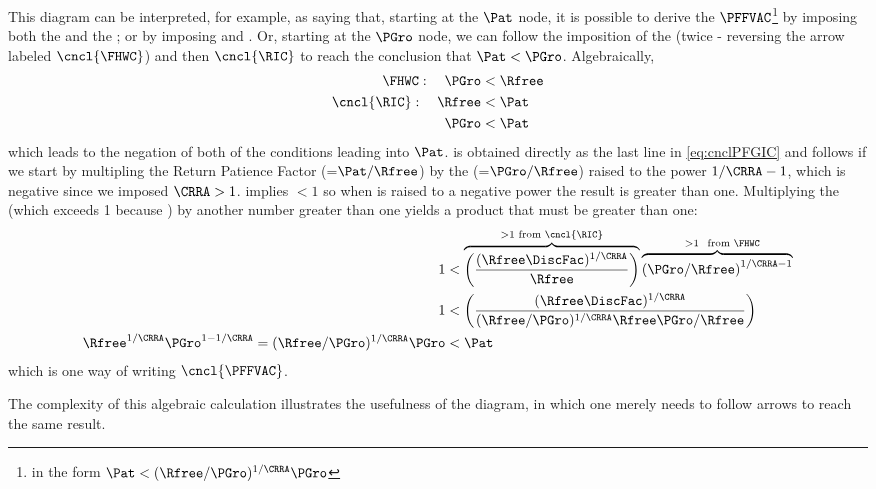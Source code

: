 \documentclass[\econtexRoot/BufferStockTheory]{subfiles}
\begin{document}
This diagram can be interpreted, for example, as saying  that, starting at the $\Pat$ node, it is possible to derive the $\PFFVAC$\footnote{in the form $\Pat < (\Rfree/\PGro)^{1/\CRRA}\PGro$} by imposing both the {\PFGIC} and the {\FHWC}; or by imposing {\RIC} and \cncl{\FHWC}.  Or, starting at the $\PGro$ node, we can follow the imposition of the {\FHWC} (twice - reversing the arrow labeled $\cncl{\FHWC}$) and then $\cncl{\RIC}$ to reach the conclusion that $\Pat < \PGro$.  Algebraically,
\begin{equation}\begin{gathered}\begin{aligned}
  {\FHWC}:~~~ \PGro & < \Rfree 
  \\ \cncl{\RIC}:~~~ \Rfree & < \Pat 
  \\ \PGro & < \Pat \label{eq:cnclPFGIC}
\end{aligned}\end{gathered}\end{equation}
which leads to the negation of both of the conditions leading into $\Pat$.  \cncl{\PFGIC} is obtained directly as the last line in \eqref{eq:cnclPFGIC} and \cncl{\PFFVAC} follows if we start by multipling the Return Patience Factor ({\RPF}=$\Pat/\Rfree$) by the \FHWF (=$\PGro/\Rfree$) raised to the power $1/\CRRA-1$, which is negative since we imposed $\CRRA > 1$.  {\FHWC} implies {\FHWF} $< 1$ so when {\FHWF} is raised to a negative power the result is greater than one.
Multiplying the {\RPF} (which exceeds 1 because \cncl{\RIC}) by another number greater than one yields a product that must be greater than one:
\begin{equation}\begin{gathered}\begin{aligned}
  1  & < \overbrace{\left(\frac{(\Rfree \DiscFac)^{1/\CRRA}}{\Rfree}\right)}^{>1 \text{~from~}\cncl{\RIC}}\overbrace{\left(\PGro/\Rfree\right)^{1/\CRRA-1}}^{\phantom{...}>1~\text{~from~} \FHWC} \notag
  \\ 1  & < \left(\frac{(\Rfree \DiscFac)^{1/\CRRA}}{(\Rfree/\PGro)^{1/\CRRA}\Rfree\PGro/\Rfree}\right) \label{eq:cnclFHWFAndcnclRICImplycnclPFFVAC}
  \\ \Rfree^{1/\CRRA}\PGro^{1 - 1/\CRRA} = (\Rfree/\PGro)^{1/\CRRA} \PGro  & < \Pat \notag
\end{aligned}\end{gathered}\end{equation}
which is one way of writing $\cncl{\PFFVAC}$.

The complexity of this algebraic calculation illustrates the usefulness of the diagram, in which one merely needs to follow arrows to reach the same result.
\end{document}
